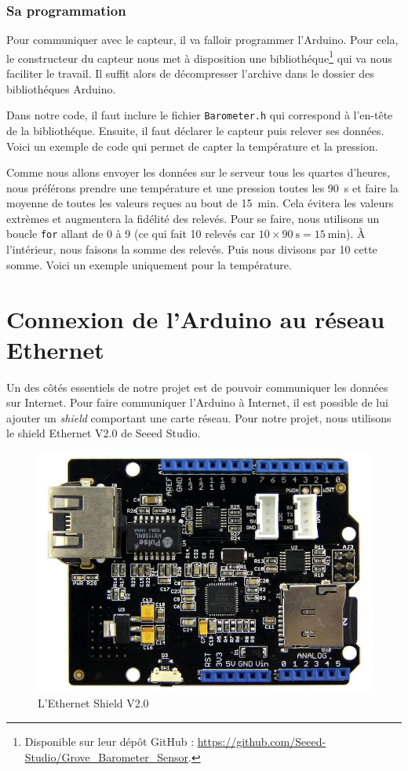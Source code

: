 \subsubsection{Sa programmation}

Pour communiquer avec le capteur, il va falloir programmer l'Arduino. Pour cela, le constructeur du capteur nous met à disposition une bibliothéque\footnote{Disponible sur leur dépôt GitHub : \url{https://github.com/Seeed-Studio/Grove_Barometer_Sensor}.} qui va nous faciliter le travail. Il suffit alors de décompresser l'archive dans le dossier des bibliothéques Arduino.

Dans notre code, il faut inclure le fichier \verb-Barometer.h- qui correspond à l'en-tête de la bibliothéque. Ensuite, il faut déclarer le capteur puis relever ses données. Voici un exemple de code qui permet de capter la température et la pression.


\Espace

Comme nous allons envoyer les données sur le serveur tous les quartes d'heures, nous préférons prendre une température et une pression toutes les \SI{90}{\second} et faire la moyenne de toutes les valeurs reçues au bout de \SI{15}{\minute}. Cela évitera les valeurs extrèmes et augmentera la fidélité des relevés. Pour se faire, nous utilisons un boucle \verb-for- allant de 0 à 9 (ce qui fait 10 relevés car $10 \times \SI{90}{\second} = \SI{15}{\minute}$). À l'intérieur, nous faisons la somme des relevés. Puis nous divisons par 10 cette somme. Voici un exemple uniquement pour la température.


\section{Connexion de l'Arduino au réseau Ethernet}

Un des côtés essentiels de notre projet est de pouvoir communiquer les données sur Internet. Pour faire communiquer l'Arduino à Internet, il est possible de lui ajouter un \emph{shield} comportant une carte réseau. Pour notre projet, nous utilisons le shield Ethernet V2.0 de Seeed Studio.

\begin{figure}
	\centering
	\includegraphics[width=.4\linewidth]{Images/Ethernet_Shield_V2-0}
	\caption{L'Ethernet Shield V2.0}
\end{figure}

